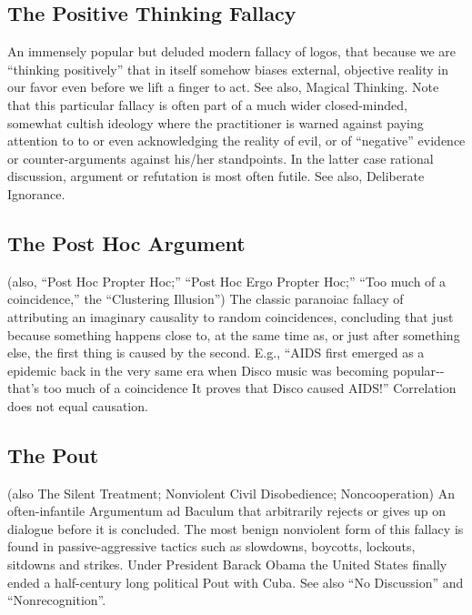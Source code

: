 \documentclass[10pt,a4paper,british]{article}
\begin{document}
\begin{multicols}{2}
	\subsection{The Positive Thinking Fallacy} An immensely popular but deluded
	modern fallacy of logos, that because we are ``thinking positively'' that
	in itself somehow biases external, objective reality in our favor even
	before we lift a finger to act. See also, Magical Thinking. Note that this
	particular fallacy is often part of a much wider closed{-}minded, somewhat
	cultish ideology where the practitioner is warned against paying attention
	to to or even acknowledging the reality of evil, or of ``negative''
	evidence or counter{-}arguments against his/her standpoints. In the latter
	case rational discussion, argument or refutation is most often futile. See
	also, Deliberate Ignorance.

    \subsection{The Post Hoc Argument} (also, ``Post Hoc Propter Hoc;''  ``Post
    Hoc Ergo Propter Hoc;'' ``Too much of a coincidence,'' the ``Clustering
    Illusion'') The classic paranoiac fallacy of attributing an imaginary
    causality to random coincidences, concluding that just because something
    happens close to, at the same time as, or just after something else, the
    first thing is caused by the second. E.g., ``AIDS first emerged as a
    epidemic back in the very same era when Disco music was becoming
    popular{-}{-}that's too much of a coincidence It proves that Disco caused
    AIDS!''  Correlation does not equal causation.

    \subsection{The Pout} (also The Silent Treatment; Nonviolent Civil
    Disobedience; Noncooperation) An often{-}infantile Argumentum ad Baculum
    that arbitrarily rejects or gives up on dialogue before it is concluded.
    The most benign nonviolent form of this fallacy is found in
    passive{-}aggressive tactics such as slowdowns, boycotts, lockouts,
    sitdowns and strikes.  Under President Barack Obama the United States
    finally ended a half{-}century long political Pout with Cuba. See also ``No
    Discussion'' and ``Nonrecognition''.


\end{multicols}
\end{document}
